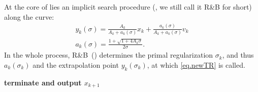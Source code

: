\documentclass[moor,sglanonrev]{informs4}
\begin{document}
At the core of  lies an implicit search procedure (, we still call it R\&B for short) along the curve:
\begin{gather} \label{eq.update yk} y_k(\sigma) = \frac{A_k}{A_k+a_k(\sigma)}x_k+\frac{a_k(\sigma)}{A_k+a_k(\sigma)}v_k\\ \label{eq.update ak} a_k(\sigma) =\frac{1+\sqrt{1+4A_k\sigma}}{2\sigma}.
\end{gather}
In the whole process, R\&B~() determines the primal regularization $\sigma_k$, and thus $a_k(\sigma_k)$ and the extrapolation point $y_k(\sigma_k)$, at which \ref{eq.newTR} is called.
\begin{algorithm}[ht]
    \caption{Accelerated Trust-Region Extragradient Method~(\atrms{})}\label{alg.ms accelerated utr}
    \begin{algorithmic}[1]
        \STATE \textbf{terminate and output $x_{k+1}$
            \label{line.early terminate ms}
        }
        \ENDIF
        \ENDFOR
    \end{algorithmic}
\end{algorithm}
\end{document}
